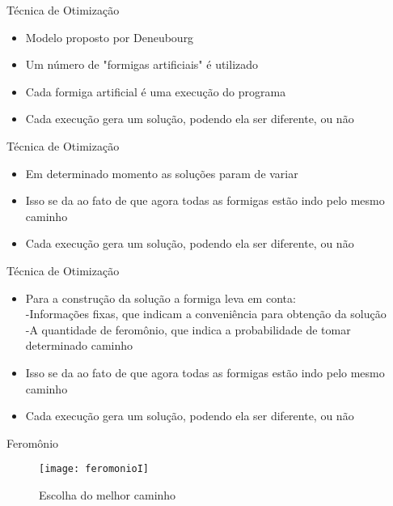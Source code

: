 \documentclass[compress]{beamer}
\begin{document}

\begin{frame}{Técnica de Otimização}
\begin{itemize}
\item{Modelo proposto por Deneubourg}
\newline
\item{Um número de "formigas artificiais" é utilizado}
\newline
\item{Cada formiga artificial é uma execução do programa}
\newline
\item{Cada execução gera um solução, podendo ela ser diferente, ou não}
\end{itemize}
\end{frame}

\begin{frame}{Técnica de Otimização}
\begin{itemize}
\item{Em determinado momento as soluções param de variar}
\newline
\item{Isso se da ao fato de que agora todas as formigas estão indo pelo mesmo caminho}
\newline
\item{Cada execução gera um solução, podendo ela ser diferente, ou não}
\end{itemize}
\end{frame}

\begin{frame}{Técnica de Otimização}
\begin{itemize}
\item{Para a construção da solução a formiga leva em conta:\\ -Informações fixas, que indicam a conveniência para obtenção da solução\\ -A quantidade de feromônio, que indica a probabilidade de tomar determinado caminho}
\newline
\item{Isso se da ao fato de que agora todas as formigas estão indo pelo mesmo caminho}
\newline
\item{Cada execução gera um solução, podendo ela ser diferente, ou não}
\end{itemize}
\end{frame}

\begin{frame}{Feromônio}
\begin{figure}[!htb]
    \centering
    \texttt{[image: feromonioI]}
    \caption{Escolha do melhor caminho}
\end{figure}
\end{frame}
\end{document}
